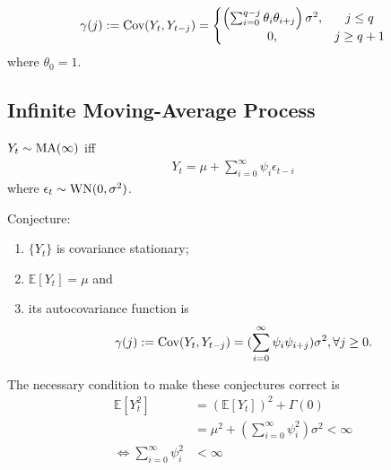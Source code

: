 \documentclass[11pt]{elegantbook}
\begin{document}
\begin{definition}
\begin{enumerate}
\begin{claim}
\begin{equation}
\begin{aligned}
                    \gamma(j):=\textnormal{Cov}(Y_t,Y_{t-j})=\left\{\begin{matrix}
                        \left(\sum_{i=0}^{q-j}\theta_i\theta_{i+j}\right)\sigma^2,&j\leq q\\
                        0,&j\geq q+1
                    \end{matrix}\right.
                \end{aligned}
                \nonumber
            \end{equation}
            where $\theta_0=1$.
        \end{claim}
    \end{enumerate}
\end{definition}



\subsection{Infinite Moving-Average Process}
\begin{definition}
    $Y_t\sim \textnormal{MA}(\infty)$ iff
        \begin{equation}
            \begin{aligned}
                Y_t=\mu+\sum_{i=0}^{\infty}\psi_i\epsilon_{t-i}
            \end{aligned}
            \nonumber
        \end{equation}
        where $\epsilon_t\sim \textnormal{WN}(0,\sigma^2)$.
\end{definition}
\begin{note}
    Conjecture:
    \begin{enumerate}
        \item $\{Y_t\}$ is covariance stationary;
        \item $\mathbb{E}[Y_t]=\mu$ and
        \item its autocovariance function is $$\gamma(j):=\textnormal{Cov}(Y_t,Y_{t-j})=(\sum_{i=0}^{\infty}\psi_i\psi_{i+j})\sigma^2,\forall j\geq 0.$$
    \end{enumerate}
\end{note}
The necessary condition to make these conjectures correct is
\begin{equation}
    \begin{aligned}
        \mathbb{E}[Y_t^2]&=(\mathbb{E}[Y_t])^2+\Gamma(0)\\
        &=\mu^2+(\sum_{i=0}^{\infty}\psi_i^2)\sigma^2<\infty\\
        \Leftrightarrow \sum_{i=0}^{\infty}\psi_i^2&<\infty
    \end{aligned}
    \nonumber
\end{equation}
\end{document}
